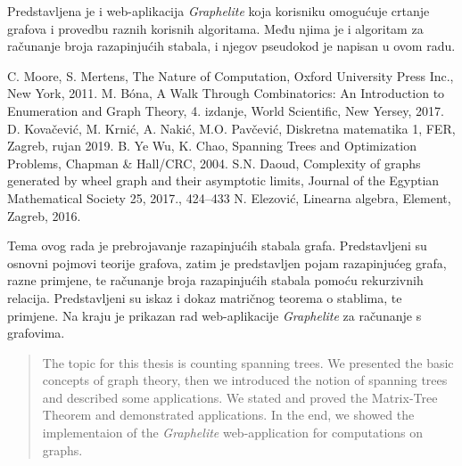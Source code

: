\documentclass[times, utf8, zavrsni]{fer}
\begin{document}
Predstavljena je i web-aplikacija \textit{Graphelite} koja korisniku omogućuje crtanje grafova i provedbu raznih korisnih algoritama. Među njima je i algoritam za računanje broja razapinjućih stabala, i njegov pseudokod je napisan u ovom radu.



\begin{thebibliography}{6}
	C. Moore, S. Mertens, The Nature of Computation, Oxford University Press Inc., New York, 2011.
	M. Bóna, A Walk Through Combinatorics: An Introduction to Enumeration and Graph Theory, 4. izdanje, World Scientific, New Yersey, 2017.
	D. Kovačević, M. Krnić, A. Nakić, M.O. Pavčević, Diskretna matematika 1, FER, Zagreb, rujan 2019.
	B. Ye Wu, K. Chao, Spanning Trees and Optimization Problems, Chapman \& Hall/CRC, 2004.
	S.N. Daoud, Complexity of graphs generated by wheel graph and their asymptotic limits, Journal of the Egyptian Mathematical Society 25, 2017., 424--433
	N. Elezović, Linearna algebra, Element, Zagreb, 2016.
\end{thebibliography}

\begin{sazetak}
Tema ovog rada je prebrojavanje razapinjućih stabala grafa. Predstavljeni su osnovni pojmovi teorije grafova, zatim je predstavljen pojam razapinjućeg grafa, razne primjene, te računanje broja razapinjućih stabala pomoću rekurzivnih relacija. Predstavljeni su iskaz i dokaz matričnog teorema o stablima, te primjene. Na kraju je prikazan rad web-aplikacije \textit{Graphelite} za računanje s grafovima.

\end{sazetak}

\begin{abstract}
The topic for this thesis is counting spanning trees. We presented the basic concepts of graph theory, then we introduced the notion of spanning trees and described some applications. We stated and proved the Matrix-Tree Theorem and demonstrated applications. In the end, we showed the implementaion of the \textit{Graphelite} web-application for computations on graphs.

\end{abstract}
\end{document}
